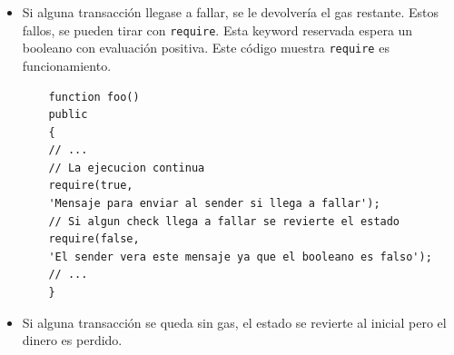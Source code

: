 \begin{itemize}
    \item Si alguna transacción llegase a fallar, se le devolvería el gas restante. Estos fallos, se pueden tirar con \texttt{require}. Esta keyword reservada espera un booleano con evaluación positiva.
Este código muestra \texttt{require} es funcionamiento.
\begin{lstlisting}
    function foo()
    public
    {
    // ... 
    // La ejecucion continua
    require(true,
    'Mensaje para enviar al sender si llega a fallar');
    // Si algun check llega a fallar se revierte el estado 
    require(false,
    'El sender vera este mensaje ya que el booleano es falso');
    // ...
    }
\end{lstlisting}
    \item Si alguna transacción se queda sin gas, el estado se revierte al inicial pero el dinero es perdido.
\end{itemize}

